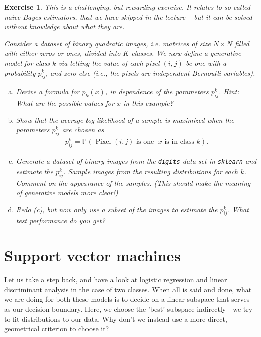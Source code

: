 \documentclass{article}
\newtheorem{exercise}{Exercise}
\begin{document}
\begin{exercise} This is a challenging, but rewarding exercise. It relates to so-called \emph{naive Bayes estimators}, that we have skipped in the lecture -- but it can be solved without knowledge about what they are.

    Consider a dataset of binary quadratic images, i.e. matrices of size $N\times N$ filled with either zeros or ones, divided into $K$ classes. We now define a generative model for class $k$ via letting the value of each pixel $(i,j)$ be one with a probability $p_{ij}^k$, and zero else (i.e., the pixels are independent Bernoulli variables).
    \begin{enumerate}[(a)]
        \item Derive a formula for $p_k(x)$, in dependence of the parameters $p_{ij}^k$. \emph{Hint: What are the possible values for $x$ in this example?}
        \item Show that the average log-likelihood of a sample is maximized when the parameters $p_{ij}^k$ are chosen as
        \begin{align*}
            p_{ij}^k = \mathbb{P}(\text{ Pixel $(i,j)$ is one} \, \vert \, x \text{ is in class } k).
        \end{align*}
        \item Generate a dataset of binary images from the \texttt{digits} data-set in \texttt{sklearn} and estimate the $p_{ij}^k$. Sample images from the resulting distributions for each $k$. Comment on the appearance of the samples. (This should make the meaning of  \emph{generative} models more clear!)
        \item Redo (c), but now only use a subset of the images to estimate the $p_{ij}^k$. What test performance do you get?
    \end{enumerate}
\end{exercise}




\section{Support vector machines}
Let us take a step back, and have a look at logistic regression and linear discriminant analysis in the case of two classes. When all is said and done, what we are doing for both these models is to decide on a linear subspace that serves as our decision boundary. Here, we choose the 
'best' subspace indirectly - we try to fit distributions to our data. Why don't we instead use a more direct, geometrical criterion to choose it?
\end{document}
